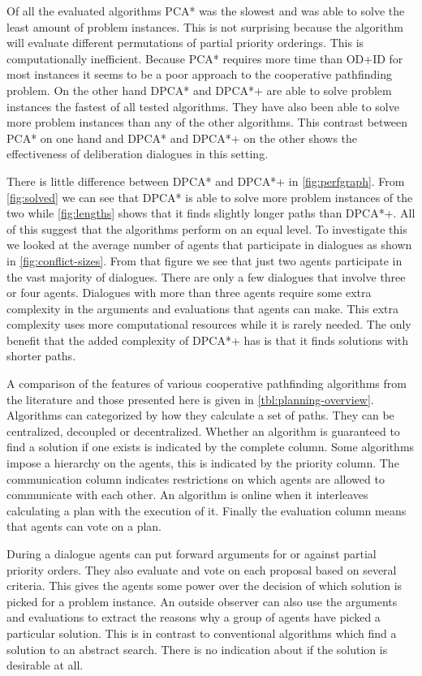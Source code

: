 Of all the evaluated algorithms PCA* was the slowest and was able to solve the 
least amount of problem instances. This is not surprising because the algorithm 
will evaluate different permutations of partial priority orderings. This is 
computationally inefficient. Because PCA* requires more time than OD+ID for 
most instances it seems to be a poor approach to the cooperative pathfinding 
problem. On the other hand  DPCA* and DPCA*+ are able to solve problem 
instances the fastest of all tested algorithms. They have also been able to 
solve more problem instances than any of the other algorithms. This contrast 
between PCA* on one hand and DPCA* and DPCA*+ on the other shows the 
effectiveness of deliberation dialogues in this setting.

There is little difference between DPCA* and DPCA*+ in \autoref{fig:perfgraph}. 
From \autoref{fig:solved} we can see that DPCA* is able to solve more problem 
instances of the two while \autoref{fig:lengths} shows that it finds slightly 
longer paths than DPCA*+. All of this suggest that the algorithms perform on an 
equal level. To investigate this we looked at the average number of agents that 
participate in dialogues as shown in \autoref{fig:conflict-sizes}. From that 
figure we see that just two agents participate in the vast majority of 
dialogues. There are only a few dialogues that involve three or four agents.
Dialogues with more than three agents require some extra complexity in the 
arguments and evaluations that agents can make. This extra complexity uses more 
computational resources while it is rarely needed. The only benefit that the 
added complexity of DPCA*+ has is that it finds solutions with shorter paths.

A comparison of the features of various cooperative pathfinding algorithms from 
the literature and those presented here is given in 
\autoref{tbl:planning-overview}. Algorithms can categorized by how  they 
calculate a set of paths. They can be centralized, decoupled or decentralized. 
Whether an algorithm is guaranteed to find a solution if one exists is 
indicated by the complete column. Some algorithms impose a hierarchy on the 
agents, this is indicated by the priority column. The communication column 
indicates restrictions on which agents are allowed to communicate with each 
other. An algorithm is online when it interleaves calculating a plan with the 
execution of it. Finally the evaluation column means that agents can vote on a 
plan.

During a dialogue agents can put forward arguments for or against partial 
priority orders. They also evaluate and vote on each proposal based on several 
criteria. This gives the agents some power over the decision of which solution 
is picked for a problem instance. An outside observer can also use the 
arguments and evaluations to extract the reasons why a group of agents have 
picked a particular solution. This is in contrast to conventional algorithms 
which find a solution to an abstract search. There is no indication about if 
the solution is desirable at all.

